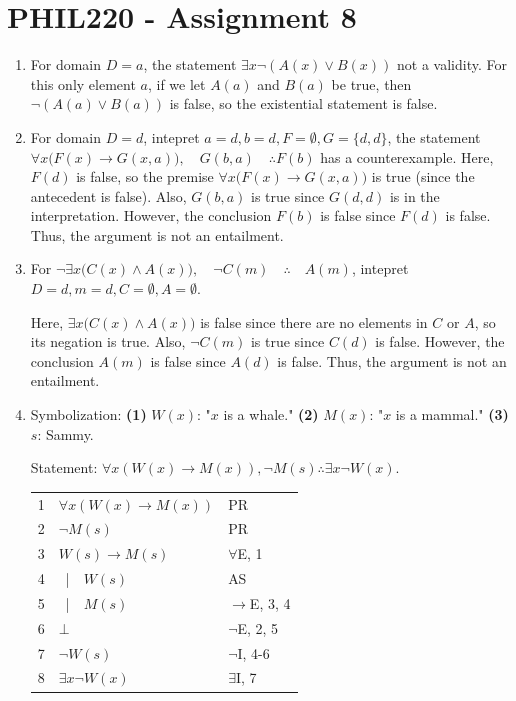\documentclass{article}
\newcommand{\asbar}{\ |\ \ }
\begin{document}
\section*{PHIL220 - Assignment 8}

\begin{enumerate}
    \item For domain $D={a}$, the statement $\exists x \neg(A(x) \lor B(x))$ not a validity. For this only element $a$, if we let $A(a)$ and $B(a)$ be true, then $\neg(A(a) \lor B(a))$ is false, so the existential statement is false.
    \item For domain $D={d}$, intepret $a=d,b=d,F=\emptyset,G=\{d,d\}$, the statement $\forall x\big(F(x)\to G(x,a)\big),\quad G(b,a)\quad\therefore F(b)$ has a counterexample. Here, $F(d)$ is false, so the premise $\forall x\big(F(x)\to G(x,a)\big)$ is true (since the antecedent is false). Also, $G(b,a)$ is true since $G(d,d)$ is in the interpretation. However, the conclusion $F(b)$ is false since $F(d)$ is false. Thus, the argument is not an entailment.
    \item For $\neg\exists x\big(C(x)\wedge A(x)\big),\quad\neg C(m)\quad\therefore\quad A(m)$, intepret $D={d},m=d,C=\emptyset, A=\emptyset$.

          Here, $\exists x\big(C(x)\wedge A(x)\big)$ is false since there are no elements in $C$ or $A$, so its negation is true. Also, $\neg C(m)$ is true since $C(d)$ is false. However, the conclusion $A(m)$ is false since $A(d)$ is false. Thus, the argument is not an entailment.
    \item Symbolization: \textbf{(1)} $W(x)$: "$x$ is a whale." \textbf{(2)} $M(x)$: "$x$ is a mammal." \textbf{(3)} $s$: Sammy.

          Statement: $\forall x (W(x) \to M(x)), \neg M(s) \therefore \exists x \neg W(x)$.

          \begin{tabular}{l|p{8cm}l}
              \hline
              1 & $\forall x (W(x) \to M(x))$ & PR            \\
              2 & $\neg M(s)$                 & PR            \\
              3 & $W(s) \to M(s)$             & $\forall$E, 1 \\
              4 & \asbar $W(s)$               & AS            \\
              5 & \asbar $M(s)$               & $\to$E, 3, 4  \\
              6 & $\bot$                      & $\neg$E, 2, 5 \\
              7 & $\neg W(s)$                 & $\neg$I, 4-6  \\
              8 & $\exists x \neg W(x)$       & $\exists$I, 7 \\
              \hline
          \end{tabular}


\end{enumerate}
\end{document}
